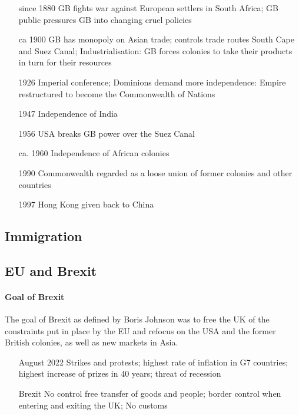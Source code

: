 \documentclass[10pt]{article}
\begin{document}
\begin{itemize}[leftmargin=5pt+]
\item[since 1880] GB fights war against European settlers in South Africa; GB public pressures GB into changing cruel policies
\item[ca 1900] GB has monopoly on Asian trade; controls trade routes South Cape and Suez Canal; Industrialisation: GB forces colonies to take their products in turn for their resources
\item[1926] Imperial conference; Dominions demand more independence: Empire restructured to become the Commonwealth of Nations 
\item[1947] Independence of India
\item[1956] USA breaks GB power over the Suez Canal
\item[ca. 1960] Independence of African colonies
\item[1990] Commonwealth regarded as a loose union of former colonies and other countries
\item[1997] Hong Kong given back to China 
\end{itemize}
\subsection{Immigration}
	\label{sec:uk/immig}
\subsection{EU and Brexit}
	\label{sec:uk/brexit}
\setcounter{sidenote}{1}

\paragraph{Goal of Brexit}\label{par:uk/brexit/goal}
The goal of Brexit as defined by Boris Johnson was to free the UK of the constraints
put in place by the EU and refocus on the USA and the former British colonies, as well as
new markets in Asia.

\begin{itemize}[leftmargin=5pt+]
\item [August 2022] Strikes and protests; highest rate of inflation in G7 countries;
highest increase of prizes in 40 years; threat of recession 
\item [Brexit] No control free transfer of goods and people; border control when entering and exiting the UK; No customs 
\end{itemize}
\end{document}
